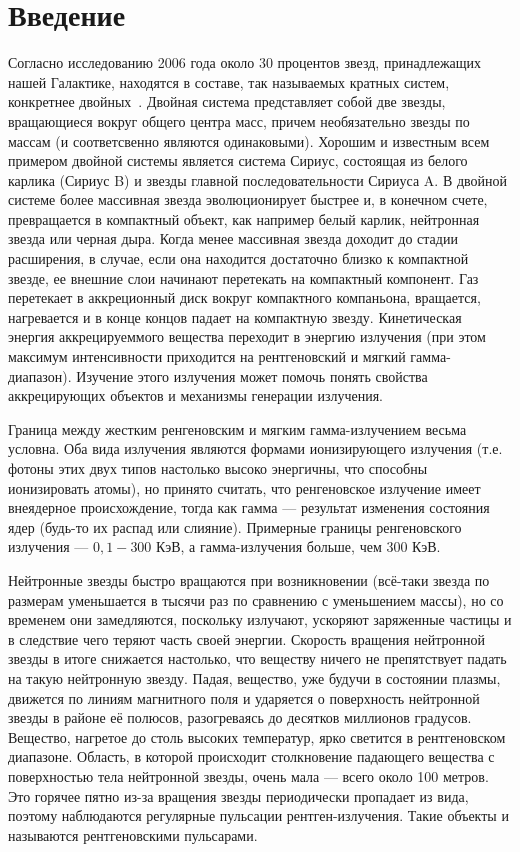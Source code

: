 
\section*{Введение}

	
	Согласно исследованию 2006 года около 30 процентов звезд, принадлежащих нашей Галактике, находятся в составе, так называемых кратных систем, конкретнее двойных~\cite{charlesj.lada}. Двойная система представляет собой две звезды, вращающиеся вокруг общего центра масс, причем необязательно звезды по массам (и соответсвенно являются одинаковыми). Хорошим и известным всем примером двойной системы является система Сириус, состоящая из белого карлика (Сириус B) и звезды главной последовательности Сириуса A. В двойной системе более массивная звезда эволюционирует быстрее и, в конечном счете, превращается в компактный объект, как например белый карлик, нейтронная звезда или черная дыра. Когда менее массивная звезда доходит до стадии расширения, в случае, если она находится достаточно близко к компактной звезде, ее внешние слои начинают перетекать на компактный компонент. Газ перетекает в аккреционный диск вокруг компактного компаньона, вращается, нагревается и в конце концов падает на компактную звезду. Кинетическая энергия аккрецируеммого вещества переходит в энергию излучения (при этом максимум интенсивности приходится на рентгеновский и мягкий гамма-диапазон). Изучение этого излучения может помочь понять свойства аккрецирующих объектов и механизмы генерации излучения.
	
	Граница между жестким ренгеновским и мягким гамма-излучением весьма условна. Оба вида излучения являются формами ионизирующего излучения (т.е. фотоны этих двух типов настолько высоко энергичны, что способны ионизировать атомы), но принято считать, что ренгеновское излучение имеет внеядерное происхождение, тогда как гамма --- результат изменения состояния ядер (будь-то их распад или слияние). Примерные границы ренгеновского излучения --- $0{,}1 - 300 $ КэВ, а гамма-излучения больше, чем $300$ КэВ.

	Нейтронные звезды быстро вращаются при возникновении (всё-таки звезда по размерам уменьшается в тысячи раз по сравнению с уменьшением массы), но со временем они замедляются, поскольку излучают, ускоряют заряженные частицы и в следствие чего теряют часть своей энергии. Скорость вращения нейтронной звезды в итоге снижается настолько, что веществу ничего не препятствует падать на такую нейтронную звезду. Падая, вещество, уже будучи в состоянии плазмы, движется по линиям магнитного поля и ударяется о поверхность нейтронной звезды в районе её полюсов, разогреваясь до десятков миллионов градусов. Вещество, нагретое до столь высоких температур, ярко светится в рентгеновском диапазоне. Область, в которой происходит столкновение падающего вещества с поверхностью тела нейтронной звезды, очень мала — всего около 100 метров. Это горячее пятно из-за вращения звезды периодически пропадает из вида, поэтому наблюдаются регулярные пульсации рентген-излучения. Такие объекты и называются рентгеновскими пульсарами. 	
	
